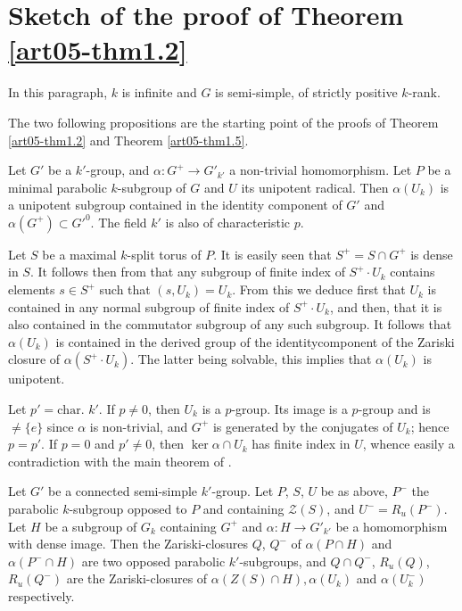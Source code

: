 \section{Sketch of the proof of Theorem \protect\ref{art05-thm1.2}}\label{art05-sec3}

In this paragraph, $k$ is infinite and $G$ is semi-simple, of strictly positive $k$-rank.

The two following propositions are the starting point of the proofs of Theorem \ref{art05-thm1.2} and Theorem \ref{art05-thm1.5}.

\begin{proposition}\label{art05-prop3.1}
Let $G'$ be a $k'$-group, and $\alpha:G^{+}\to G'_{k'}$ a non-trivial homomorphism. Let $P$ be a minimal parabolic $k$-subgroup of $G$ and $U$ its unipotent radical. Then $\alpha(U_{k})$ is a unipotent subgroup contained in the identity component of $G'$ and $\alpha(G^{+})\subset {G'}^{0}$. The field $k'$ is also of characteristic $p$.
\end{proposition}

Let $S$ be a maximal $k$-split torus of $P$. It is easily seen that $S^{+}=S\cap G^{+}$ is dense in $S$. It follows then from \cite[\S11.1]{art05-key1} that any subgroup of finite index of $S^{+}\cdot U_{k}$ contains elements $s\in S^{+}$ such that $(s,U_{k})=U_{k}$. From this we deduce first that $U_{k}$ is contained in any normal subgroup of finite index of $S^{+}\cdot U_{k}$, and then, that it is also contained in the commutator subgroup of any such subgroup. It follows that $\alpha(U_{k})$ is contained in the derived group of the identity\pageoriginale component of the Zariski closure of $\alpha(S^{+}\cdot U_{k})$. The latter being solvable, this implies that $\alpha(U_{k})$ is unipotent.

Let $p'=\text{char.~} k'$. If $p\neq 0$, then $U_{k}$ is a $p$-group. Its image is a $p$-group and is $\neq \{e\}$ since $\alpha$ is non-trivial, and $G^{+}$ is generated by the conjugates of $U_{k}$; hence $p=p'$. If $p=0$ and $p'\neq 0$, then $\ker \alpha\cap U_{k}$ has finite index in $U$, whence easily a contradiction with the main theorem of \cite{art05-key10}.

\begin{proposition}\label{art05-prop3.2}
Let $G'$ be a connected semi-simple $k'$-group. Let $P$, $S$, $U$ be as above, $P^{-}$ the parabolic $k$-subgroup opposed to $P$ and containing $\mathscr{Z}(S)$, and $U^{-}=R_{u}(P^{-})$. Let $H$ be a subgroup of $G_{k}$ containing $G^{+}$ and $\alpha : H\to G'_{k'}$ be a homomorphism with dense image. Then the Zariski-closures $Q$, $Q^{-}$ of $\alpha(P\cap H)$ and $\alpha(P^{-}\cap H)$ are two opposed parabolic $k'$-subgroups, and $Q\cap Q^{-}$, $R_{u}(Q)$, $R_{u}(Q^{-})$ are the Zariski-closures of $\alpha(Z(S)\cap H),\alpha(U_{k})$ and $\alpha(U^{-}_{k})$ respectively.
\end{proposition}

